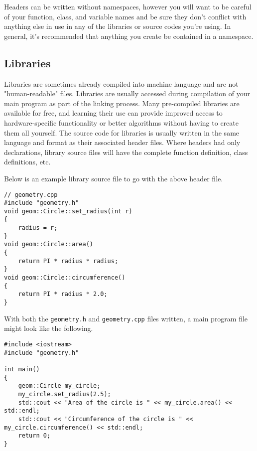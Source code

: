Headers can be written without namespaces, however you will want to be careful of your function, class, and variable names and be sure they don't conflict with anything else in use in any of the libraries or source codes you're using.  In general, it's recommended that anything you create be contained in a namespace.

\subsection*{Libraries}
Libraries are sometimes already compiled into machine language and are not "human-readable" files.  Libraries are usually accessed during compilation of your main program as part of the linking process.  Many pre-compiled libraries are available for free, and learning their use can provide improved access to hardware-specific functionality or better algorithms without having to create them all yourself.  The source code for libraries is usually written in the same language and format as their associated header files.  Where headers had only declarations, library source files will have the complete function definition, class definitions, etc.

Below is an example library source file to go with the above header file.

\begin{verbatim}
// geometry.cpp
#include "geometry.h"
void geom::Circle::set_radius(int r)
{
    radius = r;
}
void geom::Circle::area()
{
    return PI * radius * radius;
}
void geom::Circle::circumference()
{
    return PI * radius * 2.0;
}
\end{verbatim}

With both the \texttt{geometry.h} and \texttt{geometry.cpp} files written, a main program file might look like the following.

\begin{verbatim}
#include <iostream>
#include "geometry.h"

int main()
{
    geom::Circle my_circle;
    my_circle.set_radius(2.5);
    std::cout << "Area of the circle is " << my_circle.area() << std::endl;
    std::cout << "Circumference of the circle is " << my_circle.circumference() << std::endl;
    return 0;
}
\end{verbatim}
